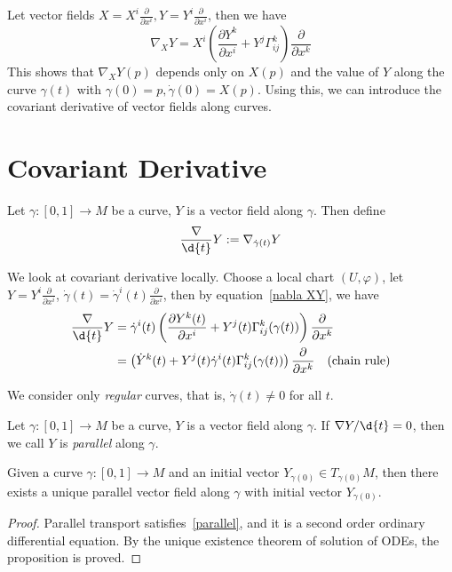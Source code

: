 Let vector fields $X=X^i\frac{\partial{}}{\partial{x^i}},Y=Y^i\frac{\partial{}}{\partial{x^i}}$, then we have
\begin{equation}
    \nabla_XY=X^i\left(\frac{\partial{Y^k}}{\partial{x^i}}+Y^j\Gamma^k_{ij}\right)\frac{\partial{}}{\partial{x^k}}\label{nabla XY}
\end{equation}
This shows that $\nabla_XY(p)$ depends only on $X(p)$ and the value of $Y$ along the curve $\gamma(t)$ with $\gamma(0)=p,\dot{\gamma}(0)=X(p)$.
Using this, we can introduce the covariant derivative of vector fields along curves.

\section{Covariant Derivative}
\begin{defn}
    Let $\gamma:[0,1]\to M$ be a curve, $Y$ is a vector field along $\gamma$.
    Then define
    \[\frac{\nabla}{\d{t}}Y:=\nabla_{\dot{\gamma}(t)}Y\]
\end{defn}

We look at covariant derivative locally.
Choose a local chart $(U,\varphi)$, let $Y=Y^i\frac{\partial{}}{\partial{x^i}}$, $\dot{\gamma}(t)=\dot{\gamma}^i(t)\frac{\partial{}}{\partial{x^i}}$, then by equation~\eqref{nabla XY}, we have
\begin{equation}
    \begin{aligned}
        \frac{\nabla}{\d{t}}Y&=\dot{\gamma}^i(t)\left(\frac{\partial{Y^k(t)}}{\partial{x^i}}+Y^j(t)\Gamma^k_{ij}(\gamma(t))\right)\frac{\partial{}}{\partial{x^k}}\\
        &=\left(\dot{Y}^k(t)+Y^j(t)\dot{\gamma}^i(t)\Gamma^k_{ij}(\gamma(t))\right)\frac{\partial{}}{\partial{x^k}}\quad\text{(chain rule)}
    \end{aligned}\label{parallel}
\end{equation}

\begin{rem}
    We consider only \emph{regular} curves, that is, $\dot\gamma(t)\neq 0$ for all $t$.
\end{rem}

\begin{defn}
    Let $\gamma:[0,1]\to M$ be a curve, $Y$ is a vector field along $\gamma$.
    If $\nabla Y/\d{t}=0$, then we call $Y$ is \emph{parallel} along $\gamma$.
\end{defn}

\begin{prop}\label{parallel transport!existence}
    Given a curve $\gamma:[0,1]\to M$ and an initial vector $Y_{\gamma(0)}\in T_{\gamma(0)}M$, then there exists a unique parallel vector field along $\gamma$ with initial vector $Y_{\gamma(0)}$.
\end{prop}
\begin{proof}
    Parallel transport satisfies~\eqref{parallel}, and it is a second order ordinary differential equation.
    By the unique existence theorem of solution of ODEs, the proposition is proved.
\end{proof}

